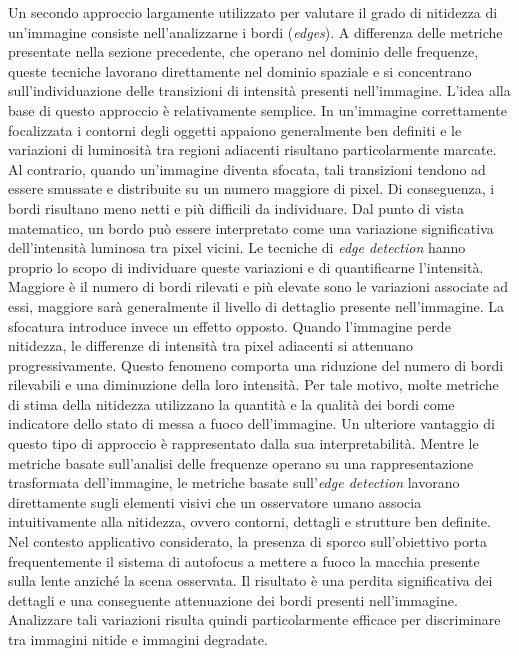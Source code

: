 \documentclass[
    target=bach,
    aauheader=,
    style=
]{thud}
\begin{document}
Un secondo approccio largamente utilizzato per valutare il grado di nitidezza di un'immagine consiste nell'analizzarne i bordi (\textit{edges}). A differenza delle metriche presentate nella sezione precedente, che operano nel dominio delle frequenze, queste tecniche lavorano direttamente nel dominio spaziale e si concentrano sull'individuazione delle transizioni di intensità presenti nell'immagine. L'idea alla base di questo approccio è relativamente semplice. In un'immagine correttamente focalizzata i contorni degli oggetti appaiono generalmente ben definiti e le variazioni di luminosità tra regioni adiacenti risultano particolarmente marcate. Al contrario, quando un'immagine diventa sfocata, tali transizioni tendono ad essere smussate e distribuite su un numero maggiore di pixel. Di conseguenza, i bordi risultano meno netti e più difficili da individuare. Dal punto di vista matematico, un bordo può essere interpretato come una variazione significativa dell'intensità luminosa tra pixel vicini. Le tecniche di \textit{edge detection} hanno proprio lo scopo di individuare queste variazioni e di quantificarne l'intensità. Maggiore è il numero di bordi rilevati e più elevate sono le variazioni associate ad essi, maggiore sarà generalmente il livello di dettaglio presente nell'immagine. La sfocatura introduce invece un effetto opposto. Quando l'immagine perde nitidezza, le differenze di intensità tra pixel adiacenti si attenuano progressivamente. Questo fenomeno comporta una riduzione del numero di bordi rilevabili e una diminuzione della loro intensità. Per tale motivo, molte metriche di stima della nitidezza utilizzano la quantità e la qualità dei bordi come indicatore dello stato di messa a fuoco dell'immagine. Un ulteriore vantaggio di questo tipo di approccio è rappresentato dalla sua interpretabilità. Mentre le metriche basate sull'analisi delle frequenze operano su una rappresentazione trasformata dell'immagine, le metriche basate sull'\textit{edge detection} lavorano direttamente sugli elementi visivi che un osservatore umano associa intuitivamente alla nitidezza, ovvero contorni, dettagli e strutture ben definite. Nel contesto applicativo considerato, la presenza di sporco sull'obiettivo porta frequentemente il sistema di autofocus a mettere a fuoco la macchia presente sulla lente anziché la scena osservata. Il risultato è una perdita significativa dei dettagli e una conseguente attenuazione dei bordi presenti nell'immagine. Analizzare tali variazioni risulta quindi particolarmente efficace per discriminare tra immagini nitide e immagini degradate.
\end{document}
